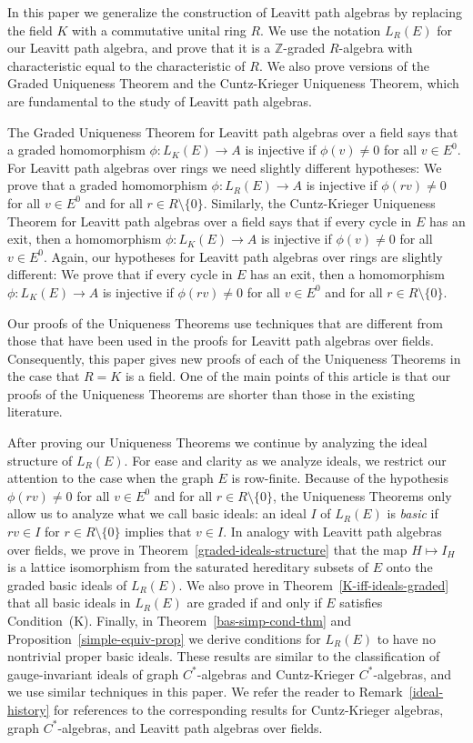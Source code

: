 \documentclass[11pt]{amsart}
\theoremstyle{remark}
\numberwithin{equation}{section}
\newcommand{\Z}{\mathbb{Z}}
\begin{document}
In this paper we generalize the construction of Leavitt path algebras by replacing the field $K$ with a commutative unital ring $R$.  We use the notation $L_R(E)$ for our Leavitt path algebra, and prove that it is a $\Z$-graded $R$-algebra with characteristic equal to the characteristic of $R$.  We also prove versions of the Graded Uniqueness Theorem and the Cuntz-Krieger Uniqueness Theorem, which are fundamental to the study of Leavitt path algebras.  

The Graded Uniqueness Theorem for Leavitt path algebras over a field says that a graded homomorphism $\phi : L_K(E) \to A$ is injective if $\phi(v) \neq 0$ for all $v \in E^0$.  For Leavitt path algebras over rings we need slightly different hypotheses: We prove that a graded homomorphism $\phi : L_R(E) \to A$ is injective if $\phi(rv) \neq 0$ for all $v \in E^0$ and for all $r \in R \setminus \{ 0 \}$.  Similarly, the Cuntz-Krieger Uniqueness Theorem for Leavitt path algebras over a field says that if every cycle in $E$ has an exit, then a homomorphism $\phi : L_K(E) \to A$ is injective if $\phi(v) \neq 0$ for all $v \in E^0$.  Again, our hypotheses for Leavitt path algebras over rings are slightly different: We prove that if every cycle in $E$ has an exit, then a homomorphism $\phi : L_K(E) \to A$ is injective if $\phi(rv) \neq 0$ for all $v \in E^0$ and for all $r \in R \setminus \{ 0 \}$.  

Our proofs of the Uniqueness Theorems use techniques that are different from those that have been used in the proofs for Leavitt path algebras over fields.  Consequently, this paper gives new proofs of each of the Uniqueness Theorems in the case that $R = K$ is a field.  One of the main points of this article is that our proofs of the Uniqueness Theorems are shorter than those in the existing literature.  

After proving our Uniqueness Theorems we continue by analyzing the ideal structure of $L_R(E)$.  For ease and clarity as we analyze ideals, we restrict our attention to the case when the graph $E$ is row-finite.  Because of the hypothesis $\phi(rv) \neq 0$ for all $v \in E^0$ and for all $r \in R \setminus \{ 0 \}$, the Uniqueness Theorems only allow us to analyze what we call basic ideals: an ideal $I$ of $L_R(E)$ is \emph{basic} if $rv \in I$ for $r \in R \setminus \{ 0 \}$ implies that $v \in I$.  In analogy with Leavitt path algebras over fields, we prove in Theorem~\ref{graded-ideals-structure} that the map $H \mapsto I_H$ is a lattice isomorphism from the saturated hereditary subsets of $E$ onto the graded basic ideals of $L_R(E)$.  We also prove in Theorem~\ref{K-iff-ideals-graded} that all basic ideals in $L_R(E)$ are graded if and only if $E$ satisfies Condition~(K).  Finally, in Theorem~\ref{bas-simp-cond-thm} and Proposition~\ref{simple-equiv-prop} we derive conditions for $L_R(E)$ to have no nontrivial proper basic ideals.  These results are similar to the classification of gauge-invariant ideals of graph $C^*$-algebras and Cuntz-Krieger $C^*$-algebras, and we use similar techniques in this paper.  We refer the reader to Remark~\ref{ideal-history} for references to the corresponding results for Cuntz-Krieger algebras, graph $C^*$-algebras, and Leavitt path algebras over fields.
\end{document}
